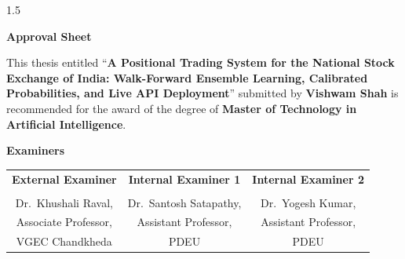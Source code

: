     \begin{spacing}{1.5}

    \begin{center}
        \textbf{\Large Approval Sheet}
    \end{center}

    \vspace{0.2cm}

    \noindent
    This thesis entitled ``\textbf{A Positional Trading System for the National Stock Exchange of India: Walk-Forward Ensemble Learning, Calibrated Probabilities, and Live API Deployment}''
    submitted by \textbf{Vishwam Shah} is recommended for the award of the degree of
    \textbf{Master of Technology in Artificial Intelligence}.

    \vspace{0.4cm}

    \begin{center}
    \textbf{Examiners}
    \end{center}

    \vspace{0.8cm}

    \begin{center}

    \begin{tabular}{ccc}

    \textbf{External Examiner} &
    \textbf{Internal Examiner 1} &
    \textbf{Internal Examiner 2} \\[1.2cm]

    \underline{\hspace{4cm}} &
    \underline{\hspace{4cm}} &
    \underline{\hspace{4cm}} \\[0.3cm]

    Dr.\ Khushali Raval, &
    Dr.\ Santosh Satapathy, &
    Dr.\ Yogesh Kumar, \\

    Associate Professor, &
    Assistant Professor, &
    Assistant Professor, \\

    VGEC Chandkheda &
    PDEU &
    PDEU \\

    \end{tabular}

    \vspace{2cm}

    \begin{tabular}{ccc}


\end{tabular}
\end{center}
\end{spacing}
